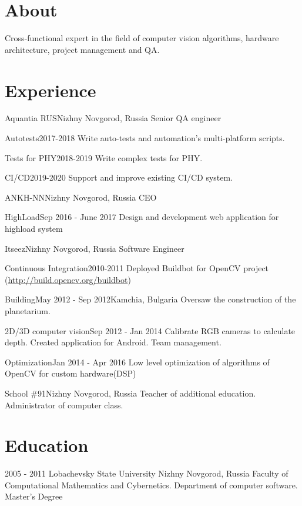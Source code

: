 \documentclass[11pt,a4paper]{moderncv}
\begin{document}
\maketitle

\section{About}
Cross-functional expert in the field of computer vision algorithms, hardware architecture, project management and QA.

\section{Experience}
	{Aquantia RUS}{Nizhny Novgorod, Russia}{}{}
  	{Senior QA engineer}
  	
\cventry{}
	{Autotests}{2017-2018}{}{}
	{Write auto-tests and automation's multi-platform scripts.}
  
\cventry{}
	{Tests for PHY}{2018-2019}{}{}
	{Write complex tests for PHY.}

\cventry{}
	{CI/CD}{2019-2020}{}{}
	{Support and improve existing CI/CD system.}

	{ANKH-NN}{Nizhny Novgorod, Russia}{}{}
  	{CEO}
  
\cventry{}
	{HighLoad}{Sep 2016 - June 2017}{}{}
	{Design and development web application for highload system}
 
	{Itseez}{Nizhny Novgorod, Russia}{}{}
	{Software Engineer}
  
\cventry{}
	{Continuous Integration}{2010-2011}{}{}
	{Deployed Buildbot for OpenCV project (\url{http://build.opencv.org/buildbot})}

\cventry{}
	{Building}{May 2012 - Sep 2012}{Kamchia, Bulgaria}{}
	{Oversaw the construction of the planetarium.}

\cventry{}
	{2D/3D computer vision}{Sep 2012 - Jan 2014}{} {}
	{Calibrate RGB cameras to calculate depth. Created application for Android. Team management.}

\cventry{}
	{Optimization}{Jan 2014 - Apr 2016}{}{}   
	{Low level optimization of algorithms of OpenCV for custom hardware(DSP)}

	{School \#91}{Nizhny Novgorod, Russia}{}{}
	{Teacher of additional education. Administrator of computer class.}
  
\section{Education}
  \cventry
    {2005 - 2011}
    {Lobachevsky State University}
    {Nizhny Novgorod, Russia}
    {}{}
    {Faculty of Computational Mathematics and Cybernetics. Department of computer software.\newline{}
    Master's Degree}
\end{document}
